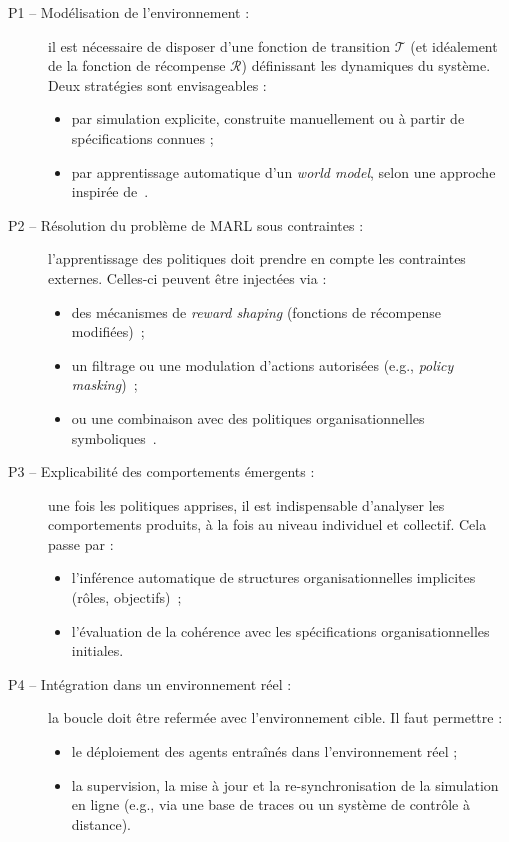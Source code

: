 \documentclass[ twoside,openright,titlepage,numbers=noenddot,headinclude,%
                footinclude=true,cleardoublepage=empty,abstractoff, %
                BCOR=5mm,paper=a4,fontsize=11pt,%
                french,american,%
                ]{scrreprt}
\begin{document}
\begin{description}
    \item[P1 -- Modélisation de l'environnement :] il est nécessaire de disposer d'une fonction de transition \(\mathcal{T}\) (et idéalement de la fonction de récompense \(\mathcal{R}\)) définissant les dynamiques du système. Deux stratégies sont envisageables : 
    \begin{itemize}
        \item par simulation explicite, construite manuellement ou à partir de spécifications connues ;
        \item par apprentissage automatique d'un \textit{world model}, selon une approche inspirée de~\cite{Ha2018}.
    \end{itemize}

    \item[P2 -- Résolution du problème de MARL sous contraintes :] l'apprentissage des politiques doit prendre en compte les contraintes externes. Celles-ci peuvent être injectées via :
    \begin{itemize}
        \item des mécanismes de \textit{reward shaping} (fonctions de récompense modifiées)~\cite{Ng1999};
        \item un filtrage ou une modulation d'actions autorisées (e.g., \textit{policy masking})~\cite{Vayer2021};
        \item ou une combinaison avec des politiques organisationnelles symboliques~\cite{Boella2008, Hübner2002}.
    \end{itemize}

    \item[P3 -- Explicabilité des comportements émergents :] une fois les politiques apprises, il est indispensable d'analyser les comportements produits, à la fois au niveau individuel et collectif. Cela passe par :
    \begin{itemize}
        \item l'inférence automatique de structures organisationnelles implicites (rôles, objectifs)~\cite{Rahwan2009};
        \item l'évaluation de la cohérence avec les spécifications organisationnelles initiales.
    \end{itemize}

    \item[P4 -- Intégration dans un environnement réel :] la boucle doit être refermée avec l'environnement cible. Il faut permettre :
    \begin{itemize}
        \item le déploiement des agents entraînés dans l'environnement réel ;
        \item la supervision, la mise à jour et la re-synchronisation de la simulation en ligne (e.g., via une base de traces ou un système de contrôle à distance).
    \end{itemize}
\end{description}
\end{document}

